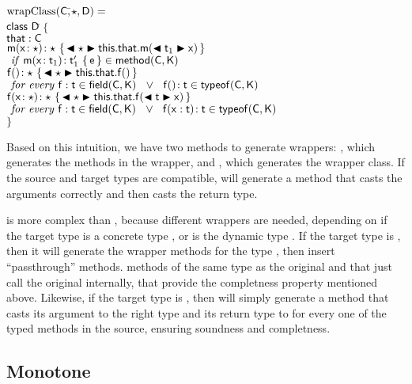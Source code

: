 \documentclass[a4paper,UKenglish,final]{lipics}
\begin{document}
\begin{tabbing}
\\
\\
$\text{wrapClass}({\sf{C}},$\=$ \star, {\sf{D}}) = $\\
\>${\sf{class}}~{\sf{D}}$\=$~\{$\\
\>\>${\sf{that}} : {\sf{C}}$ \\
\>\>$ { {\sf{m}}( {{\sf{x}}}\!:{\star})}\!:{\star}~\{\,{\blacktriangleleft \star \blacktriangleright {\sf{this}}.{\sf{that}}.{\sf{m}}(\blacktriangleleft {\sf{t}}_1 \blacktriangleright {\sf{x}})}\,\}$ \\
\qquad\qquad\qquad\qquad\qquad\qquad $\text{ \emph{if} } \Mdef\m\x{\t_1}{\tp_1}{\e} \in \method\C\K$\\
\>\>$ { {\sf{f}}()}\!:{\star}~\{\,{\blacktriangleleft \star \blacktriangleright {\sf{this}}.{\sf{that}}.{\sf{f}}()}\,\}$ \\
\qquad\qquad\qquad\qquad\qquad\qquad $\text{ \emph{for every} } {\sf{f}}:{\sf{t}} \in {\sf{field}}({\sf{C}},{\sf{K}}) ~~\vee~~  {{\sf{f}}()}\!:{{\sf{t}}} \in {\sf{typeof}}({\sf{C}},{\sf{K}})$\\
\>\>$ { {\sf{f}}( {{\sf{x}}}\!:{\star})}\!:{\star}~\{\,{\blacktriangleleft \star \blacktriangleright {\sf{this}}.{\sf{that}}.{\sf{f}}(\blacktriangleleft {\sf{t}} \blacktriangleright {\sf{x}})}\,\}$ \\
\qquad\qquad\qquad\qquad\qquad\qquad $\text{ \emph{for every} } {\sf{f}}:{\sf{t}} \in {\sf{field}}({\sf{C}},{\sf{K}}) ~~\vee~~  {{\sf{f}}({\sf{x}}:{\sf{t}})}\!:{{\sf{t}}} \in {\sf{typeof}}({\sf{C}},{\sf{K}})$\\
\>$\}$\\
\end{tabbing}

Based on this intuition, we have two methods to generate wrappers: \wm, which generates the methods in the wrapper, and \wc, which generates the wrapper class. If the source and target types are compatible, \wm will generate a method that casts the arguments correctly and then casts the return type. 

\wc is more complex than \wm, because different wrappers are needed, depending on if the target type is a concrete type \C, or is the dynamic type \any. If the target type is \C, then it will generate the wrapper methods for the type \C, then insert ``passthrough'' methods. methods of the same type as the original and that just call the original internally, that provide the completness property mentioned above. Likewise, if the target type is \any, then \wc will simply generate a method that casts its argument to the right type and its return type to \any for every one of the typed methods in the source, ensuring soundness and completness.


\subsection{Monotone}

\end{document}
